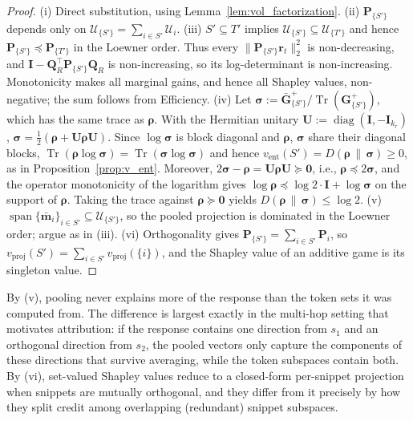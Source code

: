 \documentclass{article}
\begin{document}
\begin{proof}
(i) Direct substitution, using Lemma~\ref{lem:vol_factorization}. (ii) $\mathbf{P}_{\{S'\}}$ depends only on $\mathcal{U}_{\{S'\}} = \sum_{i \in S'} \mathcal{U}_i$. (iii) $S' \subseteq T'$ implies $\mathcal{U}_{\{S'\}} \subseteq \mathcal{U}_{\{T'\}}$ and hence $\mathbf{P}_{\{S'\}} \preceq \mathbf{P}_{\{T'\}}$ in the Loewner order. Thus every $\|\mathbf{P}_{\{S'\}} \mathbf{r}_t\|_2^2$ is non-decreasing, and $\mathbf{I} - \mathbf{Q}_R^\top \mathbf{P}_{\{S'\}} \mathbf{Q}_R$ is non-increasing, so its log-determinant is non-increasing. Monotonicity makes all marginal gains, and hence all Shapley values, non-negative; the sum follows from Efficiency. (iv) Let $\boldsymbol{\sigma} := \bar{\mathbf{G}}^{+}_{\{S'\}} / \operatorname{Tr}(\mathbf{G}^{+}_{\{S'\}})$, which has the same trace as $\boldsymbol{\rho}$. With the Hermitian unitary $\mathbf{U} := \operatorname{diag}(\mathbf{I}, -\mathbf{I}_{k_r})$, $\boldsymbol{\sigma} = \frac{1}{2}(\boldsymbol{\rho} + \mathbf{U}\boldsymbol{\rho}\mathbf{U})$. Since $\log \boldsymbol{\sigma}$ is block diagonal and $\boldsymbol{\rho}$, $\boldsymbol{\sigma}$ share their diagonal blocks, $\operatorname{Tr}(\boldsymbol{\rho} \log \boldsymbol{\sigma}) = \operatorname{Tr}(\boldsymbol{\sigma} \log \boldsymbol{\sigma})$ and hence $v_{\text{ent}}(S') = D(\boldsymbol{\rho} \,\|\, \boldsymbol{\sigma}) \ge 0$, as in Proposition~\ref{prop:v_ent}. Moreover, $2\boldsymbol{\sigma} - \boldsymbol{\rho} = \mathbf{U}\boldsymbol{\rho}\mathbf{U} \succeq \mathbf{0}$, i.e., $\boldsymbol{\rho} \preceq 2\boldsymbol{\sigma}$, and the operator monotonicity of the logarithm gives $\log \boldsymbol{\rho} \preceq \log 2 \cdot \mathbf{I} + \log \boldsymbol{\sigma}$ on the support of $\boldsymbol{\rho}$. Taking the trace against $\boldsymbol{\rho} \succeq \mathbf{0}$ yields $D(\boldsymbol{\rho} \,\|\, \boldsymbol{\sigma}) \le \log 2$. (v) $\operatorname{span}\{\bar{\mathbf{m}}_i\}_{i \in S'} \subseteq \mathcal{U}_{\{S'\}}$, so the pooled projection is dominated in the Loewner order; argue as in (iii). (vi) Orthogonality gives $\mathbf{P}_{\{S'\}} = \sum_{i \in S'} \mathbf{P}_i$, so $v_{\text{proj}}(S') = \sum_{i \in S'} v_{\text{proj}}(\{i\})$, and the Shapley value of an additive game is its singleton value.
\end{proof}

By (v), pooling never explains more of the response than the token sets it was computed from. The difference is largest exactly in the multi-hop setting that motivates attribution: if the response contains one direction from $s_1$ and an orthogonal direction from $s_2$, the pooled vectors only capture the components of these directions that survive averaging, while the token subspaces contain both. By (vi), set-valued Shapley values reduce to a closed-form per-snippet projection when snippets are mutually orthogonal, and they differ from it precisely by how they split credit among overlapping (redundant) snippet subspaces.
\end{document}
